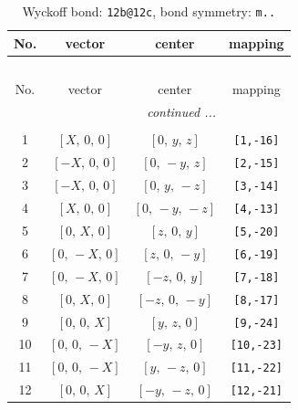 \documentclass[fleqn,8pt]{jsarticle}
\begin{document}
\begin{longtable}{cccc}
\caption{Wyckoff bond: {\tt 12b@12c}, bond symmetry: {\tt m..}}
 \\
 \hline \hline
No. & vector & center & mapping \\ \hline \endfirsthead

\multicolumn{3}{l}{\tablename\ \thetable{}} \\
 \hline \hline
No. & vector & center & mapping \\ \hline \endhead

 \hline \hline
\multicolumn{3}{r}{\footnotesize\it continued ...} \\ \endfoot

 \hline \hline
\multicolumn{3}{r}{} \\ \endlastfoot

1 & $\left[ X,\, 0,\, 0 \right]$ & $\left[ 0,\, y,\, z \right]$ & {\tt [1,-16]} \\ \hline
2 & $\left[ - X,\, 0,\, 0 \right]$ & $\left[ 0,\, - y,\, z \right]$ & {\tt [2,-15]} \\ \hline
3 & $\left[ - X,\, 0,\, 0 \right]$ & $\left[ 0,\, y,\, - z \right]$ & {\tt [3,-14]} \\ \hline
4 & $\left[ X,\, 0,\, 0 \right]$ & $\left[ 0,\, - y,\, - z \right]$ & {\tt [4,-13]} \\ \hline
5 & $\left[ 0,\, X,\, 0 \right]$ & $\left[ z,\, 0,\, y \right]$ & {\tt [5,-20]} \\ \hline
6 & $\left[ 0,\, - X,\, 0 \right]$ & $\left[ z,\, 0,\, - y \right]$ & {\tt [6,-19]} \\ \hline
7 & $\left[ 0,\, - X,\, 0 \right]$ & $\left[ - z,\, 0,\, y \right]$ & {\tt [7,-18]} \\ \hline
8 & $\left[ 0,\, X,\, 0 \right]$ & $\left[ - z,\, 0,\, - y \right]$ & {\tt [8,-17]} \\ \hline
9 & $\left[ 0,\, 0,\, X \right]$ & $\left[ y,\, z,\, 0 \right]$ & {\tt [9,-24]} \\ \hline
10 & $\left[ 0,\, 0,\, - X \right]$ & $\left[ - y,\, z,\, 0 \right]$ & {\tt [10,-23]} \\ \hline
11 & $\left[ 0,\, 0,\, - X \right]$ & $\left[ y,\, - z,\, 0 \right]$ & {\tt [11,-22]} \\ \hline
12 & $\left[ 0,\, 0,\, X \right]$ & $\left[ - y,\, - z,\, 0 \right]$ & {\tt [12,-21]} \\
\end{longtable}
\renewcommand{\arraystretch}{1.2}
\end{document}

